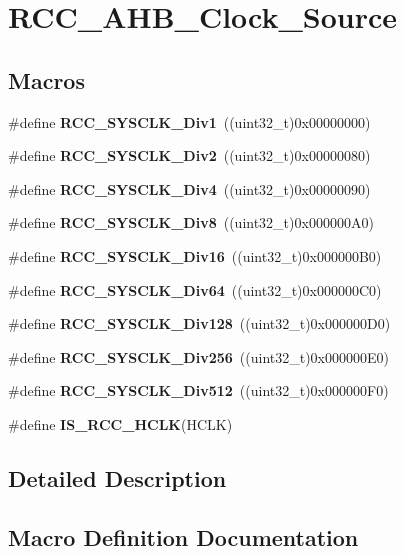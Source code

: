 \section{R\+C\+C\+\_\+\+A\+H\+B\+\_\+\+Clock\+\_\+\+Source}
\label{group__RCC__AHB__Clock__Source}
\subsection*{Macros}
\begin{DoxyCompactItemize}
\item 
\#define \textbf{ R\+C\+C\+\_\+\+S\+Y\+S\+C\+L\+K\+\_\+\+Div1}~((uint32\+\_\+t)0x00000000)
\item 
\#define \textbf{ R\+C\+C\+\_\+\+S\+Y\+S\+C\+L\+K\+\_\+\+Div2}~((uint32\+\_\+t)0x00000080)
\item 
\#define \textbf{ R\+C\+C\+\_\+\+S\+Y\+S\+C\+L\+K\+\_\+\+Div4}~((uint32\+\_\+t)0x00000090)
\item 
\#define \textbf{ R\+C\+C\+\_\+\+S\+Y\+S\+C\+L\+K\+\_\+\+Div8}~((uint32\+\_\+t)0x000000\+A0)
\item 
\#define \textbf{ R\+C\+C\+\_\+\+S\+Y\+S\+C\+L\+K\+\_\+\+Div16}~((uint32\+\_\+t)0x000000\+B0)
\item 
\#define \textbf{ R\+C\+C\+\_\+\+S\+Y\+S\+C\+L\+K\+\_\+\+Div64}~((uint32\+\_\+t)0x000000\+C0)
\item 
\#define \textbf{ R\+C\+C\+\_\+\+S\+Y\+S\+C\+L\+K\+\_\+\+Div128}~((uint32\+\_\+t)0x000000\+D0)
\item 
\#define \textbf{ R\+C\+C\+\_\+\+S\+Y\+S\+C\+L\+K\+\_\+\+Div256}~((uint32\+\_\+t)0x000000\+E0)
\item 
\#define \textbf{ R\+C\+C\+\_\+\+S\+Y\+S\+C\+L\+K\+\_\+\+Div512}~((uint32\+\_\+t)0x000000\+F0)
\item 
\#define \textbf{ I\+S\+\_\+\+R\+C\+C\+\_\+\+H\+C\+LK}(H\+C\+LK)
\end{DoxyCompactItemize}


\subsection{Detailed Description}


\subsection{Macro Definition Documentation}
\mbox{\label{group__RCC__AHB__Clock__Source_ga6e9f1c193a2f41bcb3c2f7fa8459b5b3}} 
